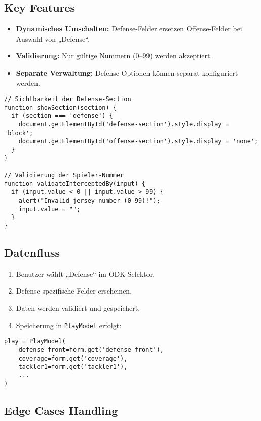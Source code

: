 \subsection{Key Features}

\begin{itemize}
  \item \textbf{Dynamisches Umschalten:} Defense-Felder ersetzen Offense-Felder bei Auswahl von „Defense“.
  \item \textbf{Validierung:} Nur gültige Nummern (0–99) werden akzeptiert.
  \item \textbf{Separate Verwaltung:} Defense-Optionen können separat konfiguriert werden.
\end{itemize}

\begin{verbatim}
// Sichtbarkeit der Defense-Section
function showSection(section) {
  if (section === 'defense') {
    document.getElementById('defense-section').style.display = 'block';
    document.getElementById('offense-section').style.display = 'none';
  }
}

// Validierung der Spieler-Nummer
function validateInterceptedBy(input) {
  if (input.value < 0 || input.value > 99) {
    alert("Invalid jersey number (0-99)!");
    input.value = "";
  }
}
\end{verbatim}

\subsection{Datenfluss}

\begin{enumerate}
  \item Benutzer wählt „Defense“ im ODK-Selektor.
  \item Defense-spezifische Felder erscheinen.
  \item Daten werden validiert und gespeichert.
  \item Speicherung in \texttt{PlayModel} erfolgt:
\end{enumerate}

\begin{verbatim}
play = PlayModel(
    defense_front=form.get('defense_front'),
    coverage=form.get('coverage'),
    tackler1=form.get('tackler1'),
    ...
)
\end{verbatim}

\subsection{Edge Cases Handling}

